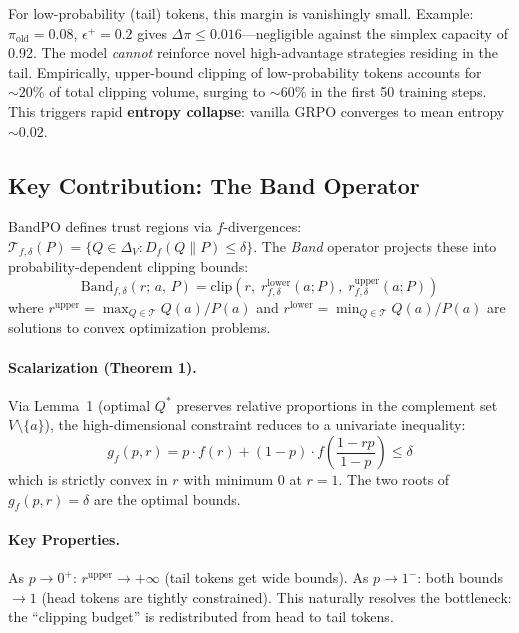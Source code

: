 \documentclass[11pt]{article}
\begin{document}
For low-probability (tail) tokens, this margin is vanishingly small. Example: $\pi_{\text{old}}{=}0.08$, $\epsilon^+{=}0.2$ gives $\Delta\pi \leq 0.016$---negligible against the simplex capacity of 0.92. The model \emph{cannot} reinforce novel high-advantage strategies residing in the tail. Empirically, upper-bound clipping of low-probability tokens accounts for ${\sim}20\%$ of total clipping volume, surging to ${\sim}60\%$ in the first 50 training steps. This triggers rapid \textbf{entropy collapse}: vanilla GRPO converges to mean entropy ${\sim}0.02$.

\subsection{Key Contribution: The Band Operator}

BandPO defines trust regions via $f$-divergences: $\mathcal{T}_{f,\delta}(P) = \{Q \in \Delta_V : D_f(Q \| P) \leq \delta\}$. The \emph{Band} operator projects these into probability-dependent clipping bounds:
\begin{equation}
    \text{Band}_{f,\delta}(r;\, a,\, P) = \text{clip}\!\left(r,\; r^{\text{lower}}_{f,\delta}(a; P),\; r^{\text{upper}}_{f,\delta}(a; P)\right)
\end{equation}
where $r^{\text{upper}} = \max_{Q \in \mathcal{T}} Q(a)/P(a)$ and $r^{\text{lower}} = \min_{Q \in \mathcal{T}} Q(a)/P(a)$ are solutions to convex optimization problems.

\paragraph{Scalarization (Theorem 1).} Via Lemma~1 (optimal $Q^*$ preserves relative proportions in the complement set $V \setminus \{a\}$), the high-dimensional constraint reduces to a univariate inequality:
\begin{equation}
    g_f(p, r) = p \cdot f(r) + (1{-}p) \cdot f\!\left(\frac{1 - rp}{1 - p}\right) \leq \delta
\end{equation}
which is strictly convex in $r$ with minimum 0 at $r{=}1$. The two roots of $g_f(p, r) = \delta$ are the optimal bounds.

\paragraph{Key Properties.} As $p \to 0^+$: $r^{\text{upper}} \to +\infty$ (tail tokens get wide bounds). As $p \to 1^-$: both bounds $\to 1$ (head tokens are tightly constrained). This naturally resolves the bottleneck: the ``clipping budget'' is redistributed from head to tail tokens.
\end{document}
